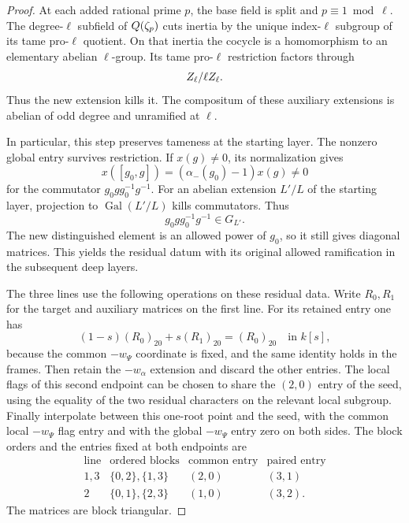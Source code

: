 \begin{proof}
At each added rational prime \(p\), the base field
is split and \(p\equiv1\bmod\ell\). The degree-\(\ell\)
subfield of \(Q(\zeta_p)\) cuts inertia by the unique
index-\(\ell\) subgroup of its tame pro-\(\ell\)
quotient. On that inertia the cocycle is a homomorphism to
an elementary abelian \(\ell\)-group. Its tame pro-\(\ell\)
restriction factors through
\[
                        Z_\ell/\ell Z_\ell .
\]
Thus the new extension kills it.
The compositum of these auxiliary extensions is
abelian of odd degree and unramified at \(\ell\).

In particular, this step preserves tameness at the
starting layer. The nonzero global entry survives
restriction. If \(x(g)\ne0\), its normalization gives
\[
 x([g_0,g])=(\alpha_-(g_0)-1)x(g)\ne0
\]
for the commutator \(g_0gg_0^{-1}g^{-1}\). For an abelian extension \(L'/L\) of the starting layer, projection to \(\operatorname{Gal}(L'/L)\) kills commutators. Thus
\[
 g_0gg_0^{-1}g^{-1}\in G_{L'}.
\]
The new distinguished
element is an allowed power of \(g_0\), so it still
gives diagonal matrices. This yields the residual
datum with its original allowed ramification in the
subsequent deep layers.
\label{cor:ordinary-promodularity-11}

The three lines use the following operations on these
residual data. Write \(R_0,R_1\) for the target and auxiliary matrices on the first line. For its retained entry one has 
\[
 (1-s)(R_0)_{20}+s(R_1)_{20}=(R_0)_{20}\quad\text{in }k[s],
\]
 because the common \(-w_\Psi\) coordinate is fixed, and the same identity holds in the frames. Then retain the \(-w_\alpha\)
extension and discard the other entries. The local
flags of this second endpoint can be chosen to share
the \((2,0)\) entry of the seed, using the equality of
the two residual characters on the relevant local
subgroup. Finally interpolate between this one-root
point and the seed, with the common local \(-w_\Psi\)
flag entry and with the global \(-w_\Psi\) entry zero
on both sides. The block orders and the entries fixed at both endpoints are
\[
 \begin{array}{c|c|c|c}
 \text{line}&\text{ordered blocks}&\text{common entry}&\text{paired entry}\\\hline
 1,3&\{0,2\},\{1,3\}&(2,0)&(3,1)\\
 2&\{0,1\},\{2,3\}&(1,0)&(3,2).
 \end{array}
\]
The matrices are block triangular.


\end{proof}
